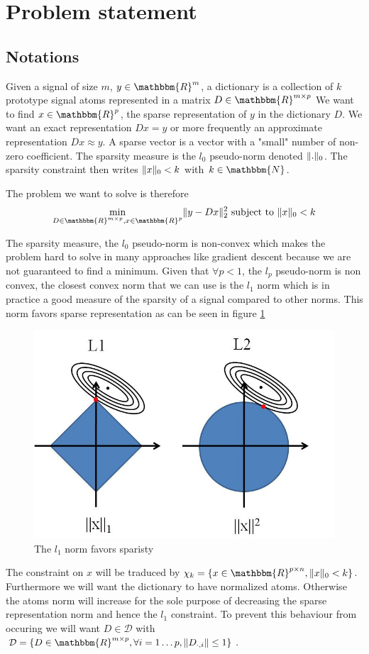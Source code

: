 \documentclass[a4paper,11pt]{article}
\newcommand{\RR}{\mathbbm{R}} %
\DeclarePairedDelimiter\norm{\lVert}{\rVert} %
\begin{document}
\section{Problem statement}
\subsection{Notations}
Given a signal of size $m$, \textbf{$y \in \RR^m$}, a dictionary is a collection of $k$ prototype signal atoms represented in a matrix $D \in \RR^{m \times p}$
We want to find $x \in \RR^p$, the sparse representation of $y$ in the dictionary $D$.
We want an exact representation $D x = y$ or more frequently an approximate representation $ D x \approx y$.
A sparse vector is a vector with a "small" number of non-zero coefficient.
The sparsity measure is the $l_0$ pseudo-norm denoted $\norm{.}_0$.
The sparsity constraint then writes $\norm{x}_0<k$ with $k \in \mathbbm{N}$.

The problem we want to solve is therefore
$$\min\limits_{D \in \RR^{m \times p}, x \in \RR^p} \norm{y - Dx}_2^2  \text{  subject to  } \norm{x}_0<k$$


The sparsity measure, the $l_0$ pseudo-norm is non-convex which makes the problem hard to solve in many approaches like gradient descent because we are not guaranteed to find a minimum.
Given that $\forall p <1$, the $l_p$ pseudo-norm is non convex, the closest convex norm that we can use is the $l_1$ norm which is in practice a good measure of the sparsity of a signal compared to other norms.
This norm favors sparse representation as can be seen in figure \ref{l1l2_norm}

\begin{figure}[!htbp]
\centering
  \includegraphics[width=0.5\linewidth]{l1l2_norm.jpg}
  \caption{The $l_1$ norm favors sparisty}
  \label{l1l2_norm}
\end{figure}

The constraint on $x$ will be traduced by $\chi_k = \{ x \in \RR^{p \times n}, \norm{x}_0<k \}$.
Furthermore we will want the dictionary to have normalized atoms.
Otherwise the atoms norm will increase for the sole purpose of decreasing the sparse representation norm and hence the $l_1$ constraint.
To prevent this behaviour from occuring we  will want $ D \in \mathcal{D} $ with $\mathcal{D} = \{ D \in \RR^{m \times p}, \forall i=1 \ldots p, \norm{D_{\cdot,i}} \leq 1 \}$.
\end{document}
